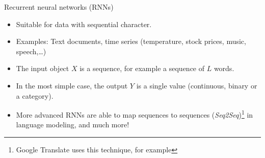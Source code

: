 \documentclass[
  10pt,
  ignorenonframetext,
  twocolumn]{beamer}
\providecommand{\tightlist}{%
  \setlength{\itemsep}{0pt}\setlength{\parskip}{0pt}}
\begin{document}
\begin{frame}{Recurrent neural networks (RNNs)}
\label{recurrent-neural-networks-rnns}
\(~\)

\begin{itemize}
\tightlist
\item
  Suitable for data with sequential character.
\end{itemize}

\vspace{2mm}

\begin{itemize}
\tightlist
\item
  Examples: Text documents, time series (temperature, stock prices,
  music, speech,\ldots)
\end{itemize}

\vspace{2mm}

\begin{itemize}
\tightlist
\item
  The input object \(X\) is a sequence, for example a sequence of \(L\)
  words.
\end{itemize}

\vspace{2mm}

\begin{itemize}
\tightlist
\item
  In the most simple case, the output \(Y\) is a single value
  (continuous, binary or a category).
\end{itemize}

\vspace{2mm}

\begin{itemize}
\tightlist
\item
  More advanced RNNs are able to map sequences to sequences
  (\emph{Seq2Seq})\footnote{Google Translate uses this technique, for example}
  in language modeling, and much more!
\end{itemize}
\end{frame}
\end{document}
